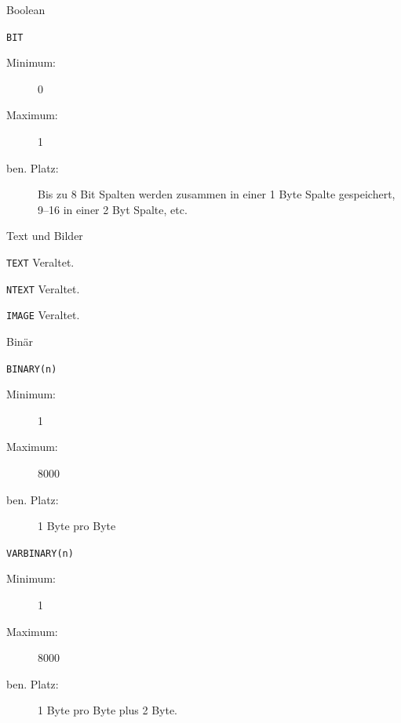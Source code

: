 \documentclass[12pt,ngerman,a4paper,index=totoc,twoside]{scrartcl}
\newcommand{\sql}[1]{\texttt{#1}}
\begin{document}
\begin{compactitem}
\begin{compactitem}
\end{compactitem}

\item Boolean
\begin{compactitem}
 \item \sql{BIT}  

  \begin{description}
  	\item[Minimum:] 0
  	\item[Maximum:] 1
  	\item[ben. Platz:] Bis zu 8 Bit Spalten werden zusammen in einer 1 Byte Spalte gespeichert, 9--16 in einer 2 Byt Spalte, etc. 
  \end{description}	
\end{compactitem}   
   
\item Text und Bilder
\begin{compactitem}
 \item \sql{TEXT} Veraltet.  

 \item \sql{NTEXT} Veraltet.  
 
 \item \sql{IMAGE} Veraltet.  
\end{compactitem}  


\item Binär
\begin{compactitem}
 \item \sql{BINARY(n)}  

  \begin{description}
  	\item[Minimum:] 1
  	\item[Maximum:] 8000
  	\item[ben. Platz:] 1 Byte pro Byte
  \end{description}	
 
 \item \sql{VARBINARY(n)}  

  \begin{description}
  	\item[Minimum:] 1
  	\item[Maximum:] 8000
  	\item[ben. Platz:] 1 Byte pro Byte plus 2 Byte.
  \end{description}	 
 

\end{compactitem}
\end{compactitem}
\end{document}
